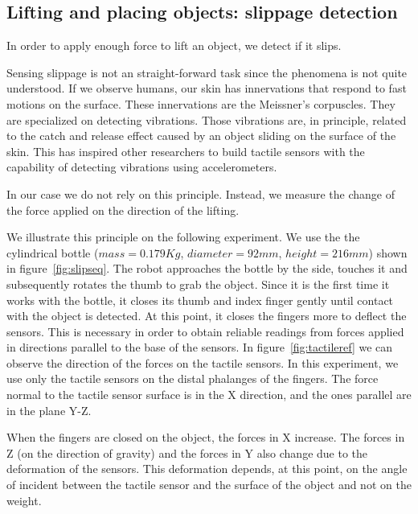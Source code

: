 \subsection{Lifting and placing objects: slippage detection}
In order to apply enough force to lift an object, we detect if it
slips.


Sensing slippage is not an straight-forward task since the
phenomena is not quite understood. If we observe humans, our skin
has innervations that respond to fast motions on the surface.
These innervations are the Meissner's corpuscles. They are
specialized on detecting vibrations. Those vibrations are, in
principle, related to the catch and release effect caused by an
object sliding on the surface of the skin. This has inspired other
researchers to build tactile sensors with the capability of
detecting vibrations using accelerometers\cite{howe89sensing}.

In our case we do not rely on this principle. Instead, we measure
the change of the force applied on the direction of the lifting.

We illustrate this principle on the following experiment. We use
the the cylindrical bottle ($mass=0.179 Kg$, $diameter=92 mm$,
$height=216 mm$) shown in figure~\ref{fig:slipseq}. The robot
approaches the bottle by the side, touches it and subsequently
rotates the thumb to grab the object. Since it is the first time
it works with the bottle, it closes its thumb and index finger
gently until contact with the object is detected. At this point,
it closes the fingers more to deflect the sensors. This is
necessary in order to obtain reliable readings from forces applied
in directions parallel to the base of the sensors. In
figure~\ref{fig:tactileref} we can observe the direction of the
forces on the tactile sensors. In this experiment, we use only the
tactile sensors on the distal phalanges of the fingers. The force
normal to the tactile sensor surface is in the X direction, and
the ones parallel are in the plane Y-Z.

When the fingers are closed on the object, the forces in X
increase. The forces in Z (on the direction of gravity) and the
forces in Y also change due to the deformation of the sensors.
This deformation depends, at this point, on the angle of incident
between the tactile sensor and the surface of the object and not
on the weight.

